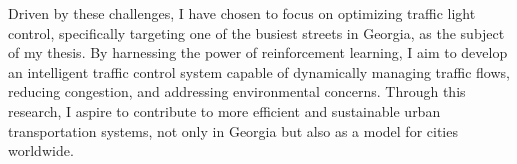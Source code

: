 Driven by these challenges, I have chosen to focus on optimizing traffic light control, specifically targeting one of the busiest streets in Georgia, as the subject of my thesis. By harnessing the power of reinforcement learning, I aim to develop an intelligent traffic control system capable of dynamically managing traffic flows, reducing congestion, and addressing environmental concerns. Through this research, I aspire to contribute to more efficient and sustainable urban transportation systems, not only in Georgia but also as a model for cities worldwide.